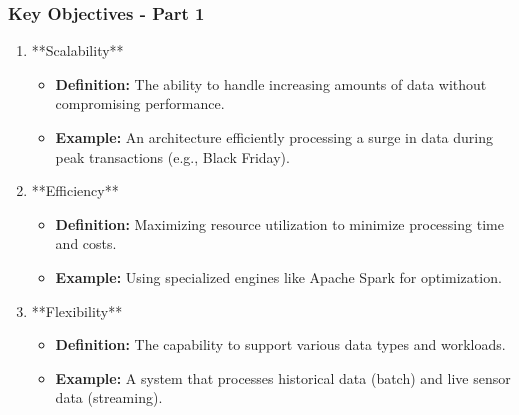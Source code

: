 \documentclass[aspectratio=169]{beamer}
\begin{document}
\begin{frame}[fragile]
    \frametitle{Key Objectives - Part 1}
    \begin{enumerate}
        \item **Scalability**
        \begin{itemize}
            \item \textbf{Definition:} The ability to handle increasing amounts of data without compromising performance.
            \item \textbf{Example:} An architecture efficiently processing a surge in data during peak transactions (e.g., Black Friday).
        \end{itemize}

        \item **Efficiency**
        \begin{itemize}
            \item \textbf{Definition:} Maximizing resource utilization to minimize processing time and costs.
            \item \textbf{Example:} Using specialized engines like Apache Spark for optimization.
        \end{itemize}

        \item **Flexibility**
        \begin{itemize}
            \item \textbf{Definition:} The capability to support various data types and workloads.
            \item \textbf{Example:} A system that processes historical data (batch) and live sensor data (streaming).
        \end{itemize}
    \end{enumerate}
\end{frame}
\end{document}
